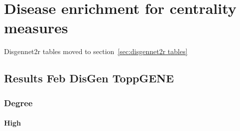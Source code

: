 \section{Disease enrichment for centrality measures}

Disgennet2r tables moved to section~\ref{sec:disgennet2r tables}



\subsection{Results Feb DisGen ToppGENE}
\subsubsection{Degree}
\paragraph{High}
